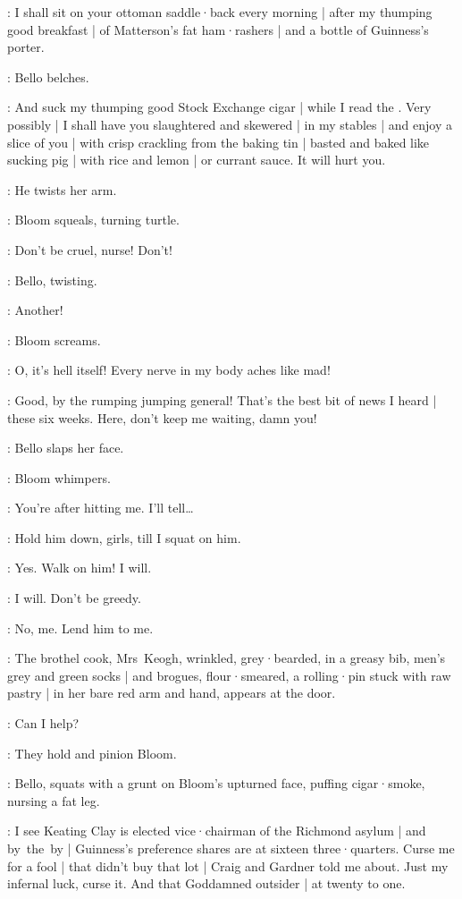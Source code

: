 \Bello:
I shall sit on your ottoman saddle·back every morning |
after my thumping good breakfast |
of Matterson's fat ham·rashers |
and a bottle of Guinness's porter.

:
Bello belches.

\Bello:
And suck my thumping good Stock Exchange cigar |
while I read the .
Very possibly |
I shall have you slaughtered and skewered |
in my stables |
and enjoy a slice of you |
with crisp crackling from the baking tin |
%
basted and baked like sucking pig |
with rice and lemon |
or currant sauce.
It will hurt you.

:
He twists her arm.

:
Bloom squeals,
turning turtle.

\Bloom:
Don't be cruel,
nurse!
Don't!

:
Bello,
twisting.

\Bello:
Another!

:
Bloom screams.

\Bloom:
O,
it's hell itself!
Every nerve in my body aches like mad!

\Bello:
Good,
by the rumping jumping general!
%
That's the best bit of news I heard |
these six weeks.
Here,
don't keep me waiting,
damn you!

:
Bello slaps her face.

:
Bloom whimpers.

\Bloom:
You're after hitting me.
I'll tell…

\Bello:
Hold him down,
girls,
till I squat on him.

\Zoe:
Yes.
Walk on him!
I will.

\Florry:
I will.
%
Don't be greedy.

\Kitty:
No,
me.
Lend him to me.

:
The brothel cook,
Mrs~Keogh,
wrinkled,
grey·bearded,
in a greasy bib,
men's grey and green socks |
and brogues,
flour·smeared,
a rolling·pin stuck with raw pastry |
in her bare red arm and hand,
appears at the door.

\MrsKeogh:
Can I help?

:
They hold and pinion Bloom.

:
Bello,
squats with a grunt on Bloom's upturned face,
%
puffing cigar·smoke,
nursing a fat leg.

\Bello:
I see Keating Clay is elected vice·chairman of the Richmond asylum |
and by~the~by |
Guinness's preference shares are at sixteen three·quarters.
Curse me for a fool |
that didn't buy that lot |
Craig and Gardner told me about.
Just my infernal luck,
curse it.
And that Goddamned outsider  |
at twenty to one.


